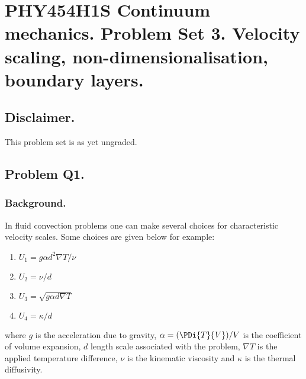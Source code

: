 %
%
%
%


\chapter{PHY454H1S Continuum mechanics.  Problem Set 3.  Velocity scaling, non-dimensionalisation, boundary layers.}
\label{chap:continuumProblemSet3}
\date{Mar 23, 2012}

\beginArtNoToc
\section{Disclaimer.}

This problem set is as yet ungraded.

\section{Problem Q1.}
\subsection{Background.}

In fluid convection problems one can make several choices for characteristic velocity scales.  Some choices are given below for example:

\begin{enumerate}
\item $U_1 = g \alpha d^2 \nabla T/\nu$
\item $U_2 = \nu/d$
\item $U_3 = \sqrt{ g \alpha d \nabla T }$
\item $U_4 = \kappa/ d$
\end{enumerate}

where $g$ is the acceleration due to gravity, $\alpha = (\PDi{T}{V})/V$ is the coefficient of volume expansion, $d$ length scale associated with the problem, $\nabla T$ is the applied temperature difference, $\nu$ is the kinematic viscosity and $\kappa$ is the thermal diffusivity.  

